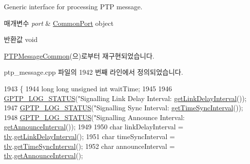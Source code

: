Generic interface for processing P\+TP message. 


\begin{DoxyParams}{매개변수}
{\em port} & \hyperlink{class_common_port}{Common\+Port} object \\
\hline
\end{DoxyParams}
\begin{DoxyReturn}{반환값}
void 
\end{DoxyReturn}


\hyperlink{class_p_t_p_message_common_a45670a42f5684252d52543f9ed3a1551}{P\+T\+P\+Message\+Common}(으)로부터 재구현되었습니다.



ptp\+\_\+message.\+cpp 파일의 1942 번째 라인에서 정의되었습니다.


\begin{DoxyCode}
1943 \{
1944     \textcolor{keywordtype}{long} \textcolor{keywordtype}{long} \textcolor{keywordtype}{unsigned} \textcolor{keywordtype}{int} waitTime;
1945 
1946     \hyperlink{gptp__log_8hpp_a9bcf107d6f77d335b92bbc4825ea85a3}{GPTP\_LOG\_STATUS}(\textcolor{stringliteral}{"Signalling Link Delay Interval: %
      \hyperlink{class_signalling_t_l_v_ad0f672510d818337df0b620de5e61b4c}{getLinkDelayInterval}());
1947     \hyperlink{gptp__log_8hpp_a9bcf107d6f77d335b92bbc4825ea85a3}{GPTP\_LOG\_STATUS}(\textcolor{stringliteral}{"Signalling Sync Interval: %
      \hyperlink{class_signalling_t_l_v_abe7998146e131f91ea7086a078b05683}{getTimeSyncInterval}());
1948     \hyperlink{gptp__log_8hpp_a9bcf107d6f77d335b92bbc4825ea85a3}{GPTP\_LOG\_STATUS}(\textcolor{stringliteral}{"Signalling Announce Interval: %
      \hyperlink{class_signalling_t_l_v_a8e20ec016bac4695f5331383a8064b2b}{getAnnounceInterval}());
1949 
1950     \textcolor{keywordtype}{char} linkDelayInterval = \hyperlink{class_p_t_p_message_signalling_ab458dc952682abd8077ce12fbff3d1d6}{tlv}.\hyperlink{class_signalling_t_l_v_ad0f672510d818337df0b620de5e61b4c}{getLinkDelayInterval}();
1951     \textcolor{keywordtype}{char} timeSyncInterval = \hyperlink{class_p_t_p_message_signalling_ab458dc952682abd8077ce12fbff3d1d6}{tlv}.\hyperlink{class_signalling_t_l_v_abe7998146e131f91ea7086a078b05683}{getTimeSyncInterval}();
1952     \textcolor{keywordtype}{char} announceInterval = \hyperlink{class_p_t_p_message_signalling_ab458dc952682abd8077ce12fbff3d1d6}{tlv}.\hyperlink{class_signalling_t_l_v_a8e20ec016bac4695f5331383a8064b2b}{getAnnounceInterval}();
}}}
\end{DoxyCode}
